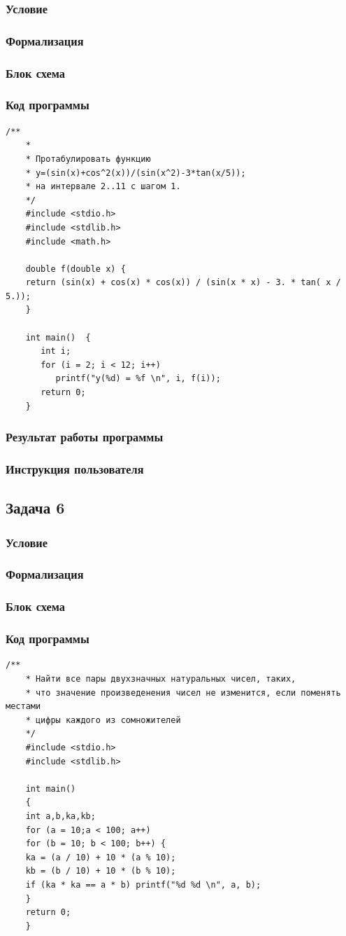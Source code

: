 \documentclass[simple,14pt]{eskdtext}
\begin{document}
	\subsubsection{Условие}
	\subsubsection{Формализация}
	\subsubsection{Блок схема}
	\subsubsection{Код программы}
	\begin{lstlisting}[label=some-code3,caption=Задача 5]
	/**
	*
	* Протабулировать функцию
	* y=(sin(x)+cos^2(x))/(sin(x^2)-3*tan(x/5));
	* на интервале 2..11 с шагом 1.
	*/
	#include <stdio.h>
	#include <stdlib.h>
	#include <math.h>
	
	double f(double x) {
	return (sin(x) + cos(x) * cos(x)) / (sin(x * x) - 3. * tan( x / 5.));
	}
	
	int main()	{
	   int i;
	   for (i = 2; i < 12; i++)
	      printf("y(%d) = %f \n", i, f(i));
	   return 0;
	}
	\end{lstlisting}
	\subsubsection{Результат работы программы}
	\subsubsection{Инструкция пользователя}
	
	\subsection{Задача 6}
	\subsubsection{Условие}
	\subsubsection{Формализация}
	\subsubsection{Блок схема}
	\subsubsection{Код программы}
	\begin{lstlisting}[label=some-code3,caption=Задача 3]
	/**
	* Найти все пары двухзначных натуральных чисел, таких,
	* что значение произведенения чисел не изменится, если поменять местами
	* цифры каждого из сомножителей
	*/
	#include <stdio.h>
	#include <stdlib.h>
	
	int main()
	{
	int a,b,ka,kb;
	for (a = 10;a < 100; a++)
	for (b = 10; b < 100; b++) {
	ka = (a / 10) + 10 * (a % 10);
	kb = (b / 10) + 10 * (b % 10);
	if (ka * ka == a * b) printf("%d %d \n", a, b);
	}
	return 0;
	}
	\end{lstlisting}
\end{document}
